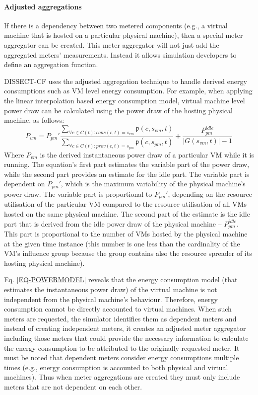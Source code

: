 \documentclass[sort, compress, 5p]{elsarticle}
\begin{document}
\paragraph{Adjusted aggregations} If there is a dependency between two metered components (e.g., a virtual machine that is hosted on a particular physical machine), then a special meter aggregator can be created. This meter aggregator will not just add the aggregated meters' measurements. Instead it allows simulation developers to define an aggregation function.

DISSECT-CF uses the adjusted aggregation technique to handle derived energy consumptions such as VM level energy consumption. For example, when applying the linear interpolation based energy consumption model, virtual machine level power draw can be calculated using the power draw of the hosting physical machine, as follows:
\begin{equation} \label{EQ-POWERMODEL}
P_{vm}=P_{pm}'\frac{\underset{\forall c\in C(t):cons(c,t)=s_{vm}}{\sum}\mathfrak{p}(c,s_{vm},t)}{\underset{\forall c\in C(t):prov(c,t)=s_{pm}}{\sum}\mathfrak{p}(c,s_{pm},t)}+\frac{P_{pm}^{idle}}{|G(s_{vm},t)|-1}
\end{equation}
Where $P_{vm}$ is the derived instantaneous power draw of a particular VM while it is running. The equation's first part estimates the variable part of the power draw, while the second part provides an estimate for the idle part. The variable part is dependent on $P_{pm}'$, which is the maximum variability of the physical machine's power draw. The variable part is proportional to $P_{pm}'$, depending on the resource utilisation of the particular VM compared to the resource utilisation of all VMs hosted on the same physical machine. The second part of the estimate is the idle part that is derived from the idle power draw of the physical machine -- $P_{pm}^{idle}$. This part is proportional to the number of VMs hosted by the physical machine at the given time instance (this number is one less than the cardinality of the VM's influence group because the group contains also the resource spreader of its hosting physical machine).

Eq. \ref{EQ-POWERMODEL} reveals that the energy consumption model (that estimates the instantaneous power draw) of the virtual machine is not independent from the physical machine's behaviour. Therefore, energy consumption cannot be directly accounted to virtual machines. When such meters are requested, the simulator identifies them as dependent meters and instead of creating independent meters, it creates an adjusted meter aggregator including those meters that could provide the necessary information to calculate the energy consumption to be attributed to the originally requested meter. It must be noted that dependent meters consider energy consumptions multiple times (e.g., energy consumption is accounted to both physical and virtual machines). Thus when meter aggregations are created they must only include meters that are not dependent on each other.
\end{document}
